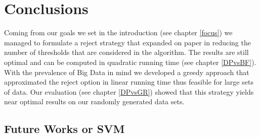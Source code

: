 %
\chapter{Conclusions}
\label{sec:conc}

Coming from our goals we set in the introduction (see chapter \ref{focus}) we managed to formulate a reject strategy that expanded on paper \cite{Fis:2015} in reducing the number of thresholds that are considered in the algorithm. The results are still optimal and can be computed in quadratic running time (see chapter \ref{DPvsBF}). With the prevalence of Big Data in mind we developed a greedy approach that approximated the reject option in linear running time thus feasible for large sets of data. Our evaluation (see chapter \ref{DPvsGR}) showed that this strategy yields near optimal results on our randomly generated data sets. 

\section{Future Works or SVM}